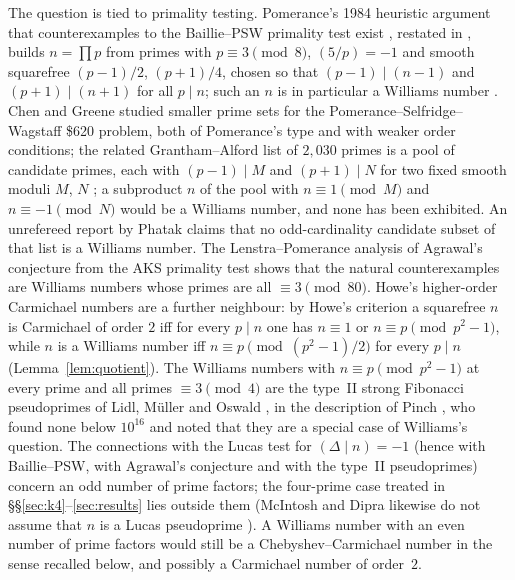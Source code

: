 \documentclass[11pt]{amsart}
\theoremstyle{definition}
\theoremstyle{remark}
\begin{document}
The question is tied to primality testing. Pomerance's 1984 heuristic argument that counterexamples to the Baillie--PSW primality test exist \cite{Pomerance84}, restated in \cite{BFW21}, builds $n=\prod p$ from primes with $p\equiv3\pmod 8$, $(5/p)=-1$ and smooth squarefree $(p-1)/2$, $(p+1)/4$, chosen so that $(p-1)\mid(n-1)$ and $(p+1)\mid(n+1)$ for all $p\mid n$; such an $n$ is in particular a Williams number \cite{McIntosh14,MD15,Zhang15}. Chen and Greene \cite{ChenGreene03} studied smaller prime sets for the Pomerance--Selfridge--Wagstaff \$620 problem, both of Pomerance's type and with weaker order conditions; the related Grantham--Alford list of $2{,}030$ primes \cite{Grantham} is a pool of candidate primes, each with $(p-1)\mid M$ and $(p+1)\mid N$ for two fixed smooth moduli $M$, $N$ \cite{ChenGreene03}; a subproduct $n$ of the pool with $n\equiv1\pmod M$ and $n\equiv-1\pmod N$ would be a Williams number, and none has been exhibited. An unrefereed report by Phatak \cite{Phatak20} claims that no odd-cardinality candidate subset of that list is a Williams number. The Lenstra--Pomerance analysis of Agrawal's conjecture from the AKS primality test \cite{AKS,LP} shows that the natural counterexamples are Williams numbers whose primes are all $\equiv3\pmod{80}$. Howe's higher-order Carmichael numbers \cite{Howe00} are a further neighbour: by Howe's criterion a squarefree $n$ is Carmichael of order $2$ iff for every $p\mid n$ one has $n\equiv1$ or $n\equiv p\pmod{p^2-1}$, while $n$ is a Williams number iff $n\equiv p\pmod{(p^2-1)/2}$ for every $p\mid n$ (Lemma~\ref{lem:quotient}). The Williams numbers with $n\equiv p\pmod{p^2-1}$ at every prime and all primes $\equiv3\pmod4$ are the type~II strong Fibonacci pseudoprimes of Lidl, M\"uller and Oswald \cite{LMO90}, in the description of Pinch \cite{Pinch07}, who found none below $10^{16}$ and noted that they are a special case of Williams's question. The connections with the Lucas test for $(\Delta\mid n)=-1$ (hence with Baillie--PSW, with Agrawal's conjecture and with the type~II pseudoprimes) concern an odd number of prime factors; the four-prime case treated in \S\S\ref{sec:k4}--\ref{sec:results} lies outside them (McIntosh and Dipra likewise do not assume that $n$ is a Lucas pseudoprime \cite[\S1]{MD15}). A Williams number with an even number of prime factors would still be a Chebyshev--Carmichael number in the sense recalled below, and possibly a Carmichael number of order~$2$.
\end{document}
